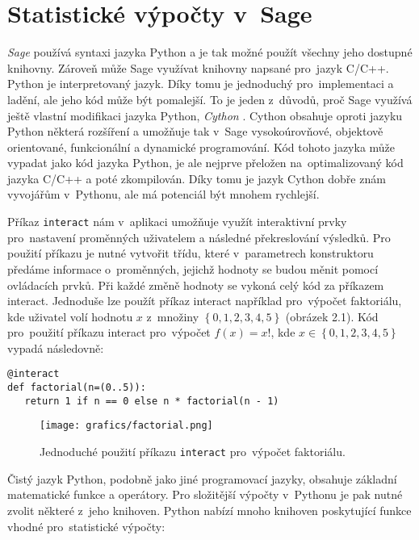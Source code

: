 \documentclass[thesis=B,czech]{FITthesis}[2012/06/26]
\begin{document}
\section{Statistické výpočty v~Sage}
\textit{Sage} používá syntaxi jazyka Python a je tak možné použít všechny jeho dostupné knihovny. Zároveň může Sage využívat knihovny napsané pro~jazyk C/C++. Python je interpretovaný jazyk. Díky tomu je jednoduchý pro~implementaci a ladění, ale jeho kód může být pomalejší. To je jeden z~důvodů, proč Sage využívá ještě vlastní modifikaci jazyka Python, \textit{Cython} \cite{CodingCython}. Cython obsahuje oproti jazyku Python některá rozšíření a umožňuje tak v~Sage vysokoúrovňové, objektově orientované, funkcionální a dynamické programování. Kód tohoto jazyka může vypadat jako kód jazyka Python, je ale nejprve přeložen na~optimalizovaný kód jazyka C/C++ a poté zkompilován. Díky tomu je jazyk Cython dobře znám vyvojářům v~Pythonu, ale má potenciál být mnohem rychlejší. 

Příkaz \texttt{interact} nám v~aplikaci umožňuje využít interaktivní prvky pro~nastavení proměnných uživatelem a následné překreslování výsledků. Pro použití příkazu je nutné vytvořit třídu, které v~parametrech konstruktoru předáme informace o~proměnných, jejichž hodnoty se budou měnit pomocí ovládacích prvků. Při každé změně hodnoty se vykoná celý kód za příkazem interact. Jednoduše lze použít příkaz interact například pro~výpočet faktoriálu, kde uživatel volí hodnotu $x$ z~množiny $\left \{0,1,2,3,4,5 \right \}$ (obrázek 2.1). Kód pro~použití příkazu interact pro~výpočet $f(x)=x!$, kde $x\in\left \{0,1,2,3,4,5 \right \}$ vypadá následovně:

\begin{verbatim}
@interact
def factorial(n=(0..5)):
   return 1 if n == 0 else n * factorial(n - 1)
\end{verbatim}

\begin{figure}[ht]
    \centering
    \texttt{[image: grafics/factorial.png]}
    \caption{Jednoduché použití příkazu \texttt{interact} pro~výpočet faktoriálu.}
\end{figure}

Čistý jazyk Python, podobně jako jiné programovací jazyky, obsahuje základní matematické funkce a operátory. Pro složitější výpočty v~Pythonu je pak nutné zvolit některé z~jeho knihoven. Python nabízí mnoho knihoven poskytující funkce vhodné pro~statistické výpočty:
\end{document}
